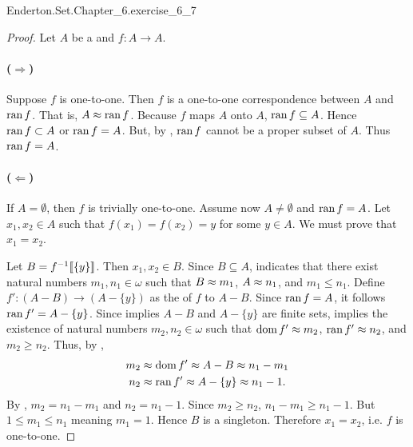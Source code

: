 \documentclass{report}
\begin{document}
    {Enderton.Set.Chapter\_6.exercise\_6\_7}

  \begin{proof}
    Let $A$ be a  and $f \colon A \rightarrow A$.

    \paragraph{($\Rightarrow$)}%

      Suppose $f$ is one-to-one.
      Then $f$ is a one-to-one correspondence between $A$ and $\mathop{\text{ran}}{f}$.
      That is, $A \approx \mathop{\text{ran}}{f}$.
      Because $f$ maps $A$ onto $A$, $\mathop{\text{ran}}{f} \subseteq A$.
      Hence $\mathop{\text{ran}}{f} \subset A$ or $\mathop{\text{ran}}{f} = A$.
      But, by , $\mathop{\text{ran}}{f}$ cannot be a proper subset of
        $A$.
      Thus $\mathop{\text{ran}}{f} = A$.

    \paragraph{($\Leftarrow$)}%

      If $A = \emptyset$, then $f$ is trivially one-to-one.
      Assume now $A \neq \emptyset$ and $\mathop{\text{ran}}{f} = A$.
      Let $x_1, x_2 \in A$ such that $f(x_1) = f(x_2) = y$ for some $y \in A$.
      We must prove that $x_1 = x_2$.

      Let $B = f^{-1}\!\left\llbracket\{y\}\right\rrbracket$.
      Then $x_1, x_2 \in B$.
      Since $B \subseteq A$,  indicates that there
        exist natural numbers $m_1, n_1 \in \omega$ such that $B \approx m_1$,
        $A \approx n_1$, and $m_1 \leq n_1$.
      Define $f' \colon (A - B) \rightarrow (A - \{y\})$ as the
         of $f$ to $A - B$.
      Since $\mathop{\text{ran}}{f} = A$, it follows $\mathop{\text{ran}}{f'} = A - \{y\}$.
      Since  implies $A - B$ and $A - \{y\}$ are
        finite sets,  implies the
        existence of natural numbers $m_2, n_2 \in \omega$ such that
        $\mathop{\text{dom}}{f'} \approx m_2$, $\mathop{\text{ran}}{f'} \approx n_2$, and $m_2 \geq n_2$.
      Thus, by ,
        \begin{align*}
          m_2 & \approx \mathop{\text{dom}}{f'} \approx A - B \approx n_1 - m_1 \\
          n_2 & \approx \mathop{\text{ran}}{f'} \approx A - \{y\} \approx n_1 - 1.
        \end{align*}
      By , $m_2 = n_1 - m_1$ and $n_2 = n_1 - 1$.
      Since $m_2 \geq n_2$, $n_1 - m_1 \geq n_1 - 1$.
      But $1 \leq m_1 \leq n_1$ meaning $m_1 = 1$.
      Hence $B$ is a singleton.
      Therefore $x_1 = x_2$, i.e. $f$ is one-to-one.

  \end{proof}
\end{document}
